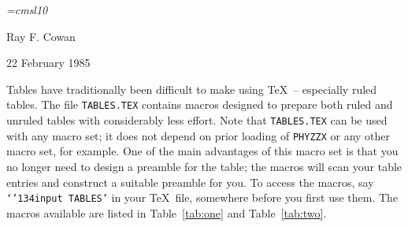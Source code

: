 \def\bs{\char'134}
\def\vbar{\char'174}
\def\and{\char'046}
\def\tc#1{\hbox{\tt \bs #1}}
\def\ctr#1{\quad #1 \hfil}
\font\sl=cmsl10
\setlength{\textwidth}{433pt}
\setlength{\oddsidemargin}{0pt}
\setlength{\marginparwidth}{72pt}
\setlength{\topmargin}{0pt}
\setlength{\textheight}{555pt}
%

\centerline{}
\vbox{\vskip 0.5in}
\centerline{Ray F. Cowan}
\centerline{22 February 1985}
\vbox{\vskip 0.5in}
Tables have traditionally been difficult to make using \TeX\ -- especially
ruled tables.  The file {\tt \hbox{TABLES.TEX}} contains macros designed to
prepare both ruled and unruled tables with considerably less effort.  Note that
\hbox{\tt TABLES.TEX} can be used with any macro set; it does not depend on
prior loading of \hbox{\tt PHYZZX} or any other macro set, for example. One of
the main advantages of this macro set is that you no longer need to design a
preamble for the table; the macros will scan your table entries and construct a
suitable preamble for you.  To access the macros, say \hbox{\tt `\bs input
TABLES'} in your \TeX\ file, somewhere before you first use them.  The macros
available are listed in Table~\ref{tab:one} and Table~\ref{tab:two}.

